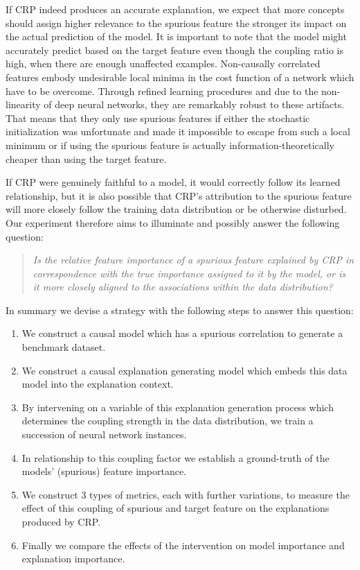 If CRP indeed produces an accurate explanation, we expect that more concepts should assign higher relevance to the spurious feature the stronger its impact on the actual prediction of the model. It is important to note that the model might accurately predict based on the target feature even though the coupling ratio is high, when there are enough unaffected examples. Non-causally correlated features embody undesirable local minima in the cost function of a network which have to be overcome. Through refined learning procedures and due to the non-linearity of deep neural networks, they are remarkably robust to these artifacts. That means that they only use spurious features if either the stochastic initialization was unfortunate and made it impossible to escape from such a local minimum or if using the spurious feature is actually information-theoretically cheaper than using the target feature. 

If CRP were genuinely faithful to a model, it would correctly follow its learned relationship, but it is also possible that CRP's attribution to the spurious feature will more closely follow the training data distribution or be otherwise disturbed. Our experiment therefore aims to illuminate and possibly answer the following question: 

\begin{quote}
\textit{Is the relative feature importance of a spurious feature explained by CRP in correspondence with the true importance assigned to it by the model, or is it more closely aligned to the associations within the data distribution?}
\end{quote} 

\filbreak
In summary we devise a strategy with the following steps to answer this question:
\begin{enumerate}
    \item We construct a causal model which has a spurious correlation to generate a benchmark dataset.
    \item We construct a causal explanation generating model which embeds this data model into the explanation context.
    \item By intervening on a variable of this explanation generation process which determines the coupling strength in the data distribution, we train a succession of neural network instances.
    \item In relationship to this coupling factor we establish a ground-truth of the models' (spurious) feature importance.
    \item We construct 3 types of metrics, each with further variations, to measure the effect of this coupling of spurious and target feature on the explanations produced by CRP.
    \item Finally we compare the effects of the intervention on model importance and explanation importance.
\end{enumerate}
\filbreak

